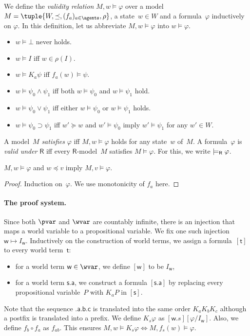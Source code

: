 \documentclass[doctor]{iscs-thesis}
\begin{document}
\begin{definition}
 We define the \textit{validity relation} $M,w\models\varphi$ over a model
 $M = \tuple{W,\preceq,(f_a)_{a\in \agents},\rho}$, a state~$w\in W$ and a
 formula~$\varphi$ inductively on $\varphi$.
 In this definition, let
 us abbreviate $M,w\models \varphi$ into $w\models \varphi$\enspace.
\newcommand{\m}{}
\begin{itemize}
\item $w\models \bot$ never holds.
\item $w\models I$ iff
$w \in
 \rho(I)$.
\item	    $w\models K_a \psi$ iff
	    $f_a(w)\models \psi$.
\item $w\models \psi_0\wedge\psi_1$ iff both
 $w\models \psi_0$ and $w\models \psi_1$ hold.
\item
 $ w\models \psi_0\vee\psi_1$ iff either
 $ w\models \psi_0$ or $w\models \psi_1$ holds.
\item
	   $w\models \psi_0\supset\psi_1$ iff 
	   $w'\succeq w$ and $w'\models \psi_0$ imply
	   $w'\models\psi_1$ for any $w'\in W$\enspace.
\end{itemize}
\end{definition}
A model~$M$ \textit{satisfies} $\varphi$ iff $M,w\models\varphi$ holds for any
state~$w$ of~$M$.
A formula~$\varphi$ is \textit{valid under} $\mathsf R$ iff
every $\mathsf R$-model~$M$ satisfies $M\models \varphi$.
For this, we write $\models_{\mathsf R} \varphi$\enspace.

\begin{lemma}
 \label{monot}
 $M,w\models\varphi$ and $w\preceq v$ imply 
$M,v\models\varphi$.
\end{lemma}
\begin{proof}
 Induction on~$\varphi$.
 We use monotonicity of $f_a$ here.
\end{proof}

\paragraph{The proof system.}
Since both $\pvar$ and $\wvar$ are countably infinite,
there is an injection that maps a world variable to a propositional
variable.
We fix one such injection
$\mathsf w\mapsto I_{\mathsf w}$.
Inductively on the construction of world terms,
we assign a formula~$[\mathsf t]$ to every world term~$\mathsf t$:
\begin{itemize}
 \item for a world term $\mathsf w\in \wvar$, we define $[\mathsf w]$ to be
       $I_{\mathsf w}$,
 \item for a world term $\mathsf{s.a}$, we construct
 a formula $[\mathsf{s.a}]$ by
replacing every propositional variable~$P$ with $K_aP$ in $[\mathsf s]$.
\end{itemize}
Note that the sequence $\mathsf{.a.b.c}$ is translated into the same
order $K_a K_b K_c$ although a postfix is translated into a prefix.
We define $K_s\varphi$ as $[\mathsf w.s][\varphi/I_{\mathsf w}]$.
Also, we define $f_b\circ f_a$ as $f_{ab}$.  This ensures $M, w\models
K_s\varphi\Leftrightarrow M,f_s(w)\models\varphi$.
\end{document}
